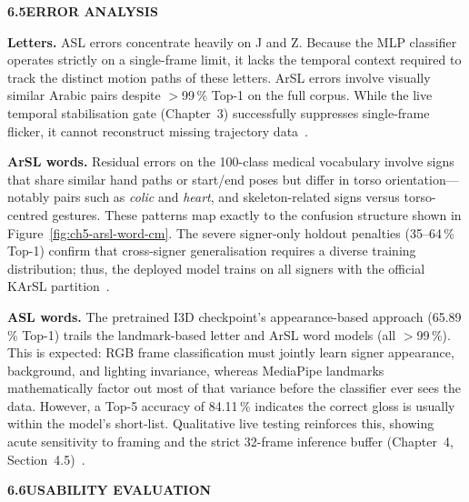 \noindent\textbf{6.5\quad ERROR ANALYSIS}\par
{}
\vspace{0.2cm}

\noindent\textbf{Letters.} ASL errors concentrate heavily on J and Z. Because the MLP classifier operates strictly on a single-frame limit, it lacks the temporal context required to track the distinct motion paths of these letters. ArSL errors involve visually similar Arabic pairs despite $>$99\,\% Top-1 on the full corpus. While the live temporal stabilisation gate (Chapter~3) successfully suppresses single-frame flicker, it cannot reconstruct missing trajectory data~\cite{akash2019aslalphabet,arthur2018arasl2018}.\par\vspace{0.3cm}

\noindent\textbf{ArSL words.} Residual errors on the 100-class medical vocabulary involve signs that share similar hand paths or start/end poses but differ in torso orientation---notably pairs such as \emph{colic} and \emph{heart}, and skeleton-related signs versus torso-centred gestures. These patterns map exactly to the confusion structure shown in Figure~\ref{fig:ch5-arsl-word-cm}. The severe signer-only holdout penalties (35--64\,\% Top-1) confirm that cross-signer generalisation requires a diverse training distribution; thus, the deployed model trains on all signers with the official KArSL partition~\cite{johnson2019signer,sidig2021karsl}.\par\vspace{0.3cm}

\noindent\textbf{ASL words.} The pretrained I3D checkpoint's appearance-based approach (65.89\,\% Top-1) trails the landmark-based letter and ArSL word models (all $>$99\,\%). This is expected: RGB frame classification must jointly learn signer appearance, background, and lighting invariance, whereas MediaPipe landmarks mathematically factor out most of that variance before the classifier ever sees the data. However, a Top-5 accuracy of 84.11\,\% indicates the correct gloss is usually within the model's short-list. Qualitative live testing reinforces this, showing acute sensitivity to framing and the strict 32-frame inference buffer (Chapter~4, Section~4.5)~\cite{li2020wlasl}.\par\vspace{0.4cm}

\noindent\textbf{6.6\quad USABILITY EVALUATION}\par
{}
\vspace{0.2cm}

